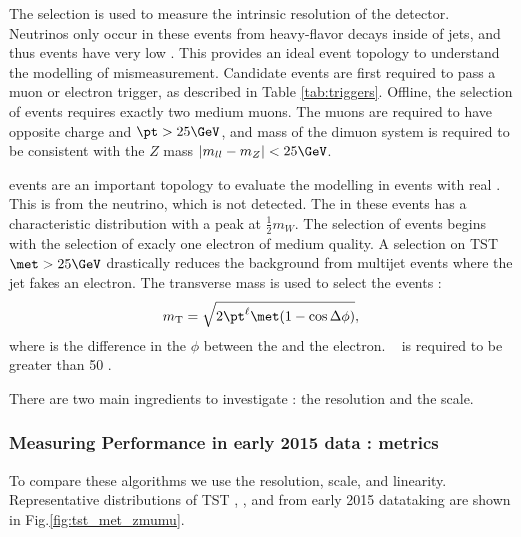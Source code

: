 The \Zll selection is used to measure the intrinsic \met resolution of the detector.
Neutrinos only occur in these events from heavy-flavor decays inside of jets, and thus \Zll events have very low \met.
This provides an ideal event topology to understand the modelling of \met mismeasurement.
Candidate \Zmm events are first required to pass a muon or electron trigger, as described in Table \ref{tab:triggers}.
Offline, the selection of \Zmm events requires exactly two medium muons.
The muons are required to have opposite charge and $\pt > 25 \GeV$, and mass of the dimuon system is required to be consistent with the $Z$ mass $|m_{ll} - m_Z | < 25 \GeV$.

\Wln events are an important topology to evaluate the \met modelling in events with real \met.
This \met is from the neutrino, which is not detected.
The \met in these events has a characteristic distribution with a peak at $\frac{1}{2} m_W$.
The selection of \Wen events begins with the selection of exacly one electron of medium quality.
A selection on TST $\met > 25 \GeV$  drastically reduces the background from multijet events where the jet fakes an electron.
The transverse mass is used to select the \Wen events :
\begin{equation}
  \mT = \sqrt{ 2\pt^{\ell} \met (1-\cos{\deltaPhi}) },
\label{eq:mT}
\end{equation}
where \deltaPhi is the difference in the $\phi$ between the \met and the electron.
\mT~ is required to be greater than 50 \GeV.

There are two main ingredients to investigate : the \met resolution and the \met scale.

\subsubsection{Measuring \met Performance in early 2015 data : metrics}

To compare these algorithms we use the \met resolution, \met scale, and linearity.
Representative distributions of TST , , and  \met from early 2015 datataking are shown in Fig.\ref{fig:tst_met_zmumu}.

